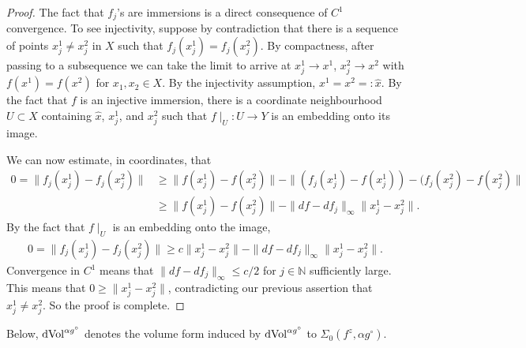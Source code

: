 \documentclass[11pt]{amsart}
\theoremstyle{definition}
\numberwithin{equation}{section}
\begin{document}
\begin{proof}
The fact that $f_j$'s are immersions is a direct consequence of $C^1$ convergence. To see injectivity, suppose by contradiction that there is a sequence of points $x^1_j\neq x_j^2$ in $X$ such that $f_j(x_j^1) = f_j(x_j^2)$. By compactness, after passing to a subsequence we can take the limit to arrive at $x_j^1\to x^1$, $x_j^2\to x^2$ with $f(x^1) = f(x^2)$ for $x_1, x_2 \in X$. By the injectivity assumption, $x^1 = x^2 =: \hat x$. By the fact that $f$ is an injective immersion, there is a coordinate neighbourhood $U\subset X$ containing $\hat x$, $x_j^1$, and $x_j^2$ such that $f\mid_U: U \to Y$ is an embedding onto its image.

We can now estimate, in coordinates, that
\begin{align*}
0=\|f_j(x^1_j) - f_j(x^2_j)\|& \geq \| f(x^1_j) - f(x^2_j)\| - \|(f_j(x_j^1) - f(x_j^1)) - (f_j(x_j^2) - f(x_j^2) \|\\ &\geq \| f(x^1_j) - f(x^2_j)\|- \|df - df_j\|_\infty \|x_j^1 - x_j^2\|.
\end{align*}
By the fact that $f\mid_U$ is an embedding onto the image,
\begin{eqnarray*}
0=\|f_j(x^1_j) - f_j(x^2_j)\|\geq c\|x_j^1 - x_j^2\|- \|df - df_j\|_\infty \|x_j^1 - x_j^2\|.
\end{eqnarray*}
Convergence in $C^1$ means that $\|df - df_j\|_\infty\leq c/2$ for $j\in \mathbb N$ sufficiently large. This means that $0\geq\| x_j^1-x_j^2\|$, contradicting our previous assertion that $x_j^1\neq x_j^2$. So the proof is complete.
\end{proof}



Below,  ${\rm dVol}^{\alpha g^\circ}$ denotes the volume form induced by ${\rm dVol}^{\alpha g^\circ}$  to $\Sigma_0(f^z,\alpha g^\circ)$.
\end{document}
